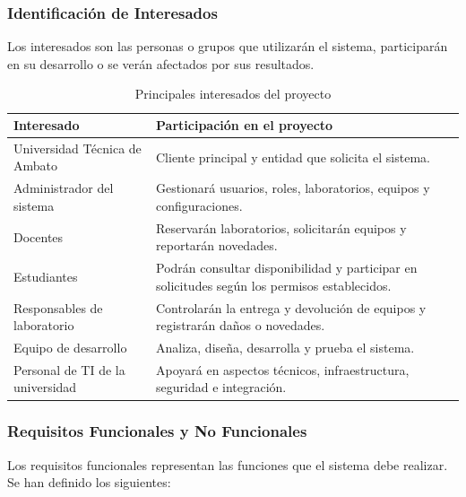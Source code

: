 \documentclass[pdflatex,sn-mathphys-num]{sn-jnl}%
\theoremstyle{thmstyleone}%
\theoremstyle{thmstyletwo}%
\theoremstyle{thmstylethree}%
\begin{document}
 \subsubsection{Identificación de Interesados}
 
 Los interesados son las personas o grupos que utilizarán el sistema, participarán en su desarrollo o se verán afectados por sus resultados.
 
 \begin{table}[htbp]
 	\centering
 	\caption{Principales interesados del proyecto}
 	\label{tab:interesados}
 	\begin{tabular}{|p{5cm}|p{8cm}|}
 		\hline
 		\textbf{Interesado} & \textbf{Participación en el proyecto} \\ \hline
 		
 		Universidad Técnica de Ambato &
 		Cliente principal y entidad que solicita el sistema. \\ \hline
 		
 		Administrador del sistema &
 		Gestionará usuarios, roles, laboratorios, equipos y configuraciones. \\ \hline
 		
 		Docentes &
 		Reservarán laboratorios, solicitarán equipos y reportarán novedades. \\ \hline
 		
 		Estudiantes &
 		Podrán consultar disponibilidad y participar en solicitudes según los permisos establecidos. \\ \hline
 		
 		Responsables de laboratorio &
 		Controlarán la entrega y devolución de equipos y registrarán daños o novedades. \\ \hline
 		
 		Equipo de desarrollo &
 		Analiza, diseña, desarrolla y prueba el sistema. \\ \hline
 		
 		Personal de TI de la universidad &
 		Apoyará en aspectos técnicos, infraestructura, seguridad e integración. \\ \hline
 		
 	\end{tabular}
 \end{table}
 
 \subsubsection{Requisitos Funcionales  y No Funcionales }
 
 Los requisitos funcionales representan las funciones que el sistema debe realizar. Se han definido los siguientes:
 
\end{document}
